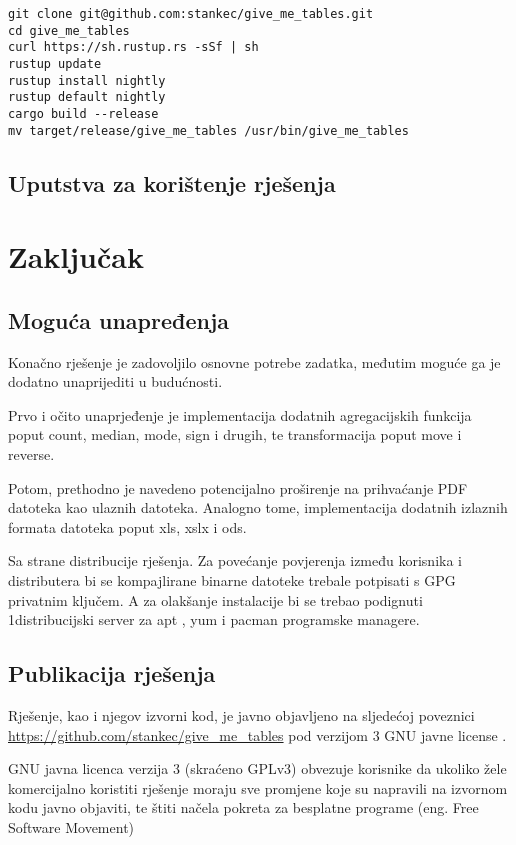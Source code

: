 \documentclass[times, utf8, zavrsni]{fer}
\begin{document}
\begin{lstlisting}
git clone git@github.com:stankec/give_me_tables.git
cd give_me_tables
curl https://sh.rustup.rs -sSf | sh
rustup update
rustup install nightly
rustup default nightly
cargo build --release
mv target/release/give_me_tables /usr/bin/give_me_tables
\end{lstlisting}

\section{Uputstva za korištenje rješenja}



\chapter{Zaključak}

\section{Moguća unapređenja}

Konačno rješenje je zadovoljilo osnovne potrebe zadatka, međutim moguće ga je
dodatno unaprijediti u budućnosti.

Prvo i očito unaprjeđenje je implementacija dodatnih agregacijskih funkcija
poput count, median, mode, sign i drugih, te transformacija poput move i
reverse.

Potom, prethodno je navedeno potencijalno proširenje na prihvaćanje PDF
datoteka kao ulaznih datoteka. Analogno tome, implementacija dodatnih
izlaznih formata datoteka poput xls, xslx i ods.

Sa strane distribucije rješenja. Za povećanje povjerenja između korisnika i
distributera bi se kompajlirane binarne datoteke trebale potpisati s GPG
privatnim ključem. A za olakšanje instalacije bi se trebao podignuti
1distribucijski server za apt \cite{apt_wiki}, yum \cite{yum_wiki} i
pacman \cite{pacman_wiki} programske managere.

\section{Publikacija rješenja}

Rješenje, kao i njegov izvorni kod, je javno objavljeno na sljedećoj
poveznici \url{https://github.com/stankec/give_me_tables} pod verzijom 3 GNU
javne license \cite{gplv3_license}.

GNU javna licenca verzija 3 (skraćeno GPLv3) obvezuje korisnike da ukoliko
žele komercijalno koristiti rješenje moraju sve promjene koje su napravili na
izvornom kodu javno objaviti, te štiti načela pokreta za besplatne programe
\cite{free_software_movement_manifesto} (eng. Free Software Movement)
\end{document}
